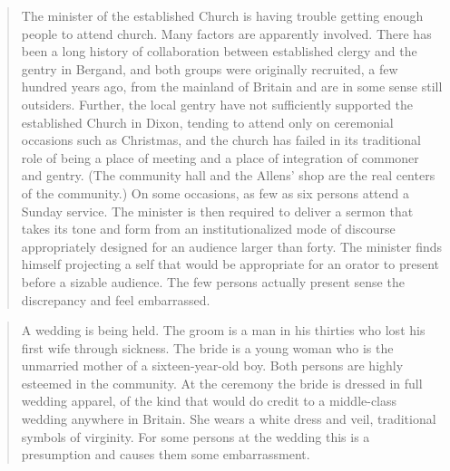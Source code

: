 \documentclass[twoside,symmetric,nobib,justified]{tufte-book}
\begin{document}
\begin{quote}
The minister of the established Church is having trouble getting enough
people to attend church. Many factors are apparently involved. There has
been a long history of collaboration between established clergy and the
gentry in Bergand, and both groups were originally recruited, a few
hundred years ago, from the mainland of Britain and are in some sense
still outsiders. Further, the local gentry have not sufficiently
supported the established Church in Dixon, tending to attend only on
ceremonial occasions such as Christmas, and the church has failed in its
traditional role of being a place of meeting and a place of integration
of commoner and gentry. (The community hall and the Allens' shop are the
real centers of the community.) On some occasions, as few as six persons
attend a Sunday service. The minister is then required to deliver a
sermon that takes its tone and form from an institutionalized mode of
discourse appropriately designed for an audience larger than forty. The
minister finds himself projecting a self that would be appropriate for
an orator to present before a sizable audience. The few persons actually
present sense the discrepancy and feel embarrassed.
\end{quote}

\begin{quote}
A wedding is being held. The groom is a man in his thirties who lost his
first wife through sickness. The bride is a young woman who is the
unmarried mother of a sixteen-year-old boy. Both persons are highly
esteemed in the community. At the ceremony the bride is dressed in full
wedding apparel, of the kind that would do credit to a middle-class
wedding anywhere in Britain. She wears a white dress and veil,
traditional symbols of virginity. For some persons at the wedding this
is a presumption and causes them some embarrassment.
\end{quote}
\end{document}
